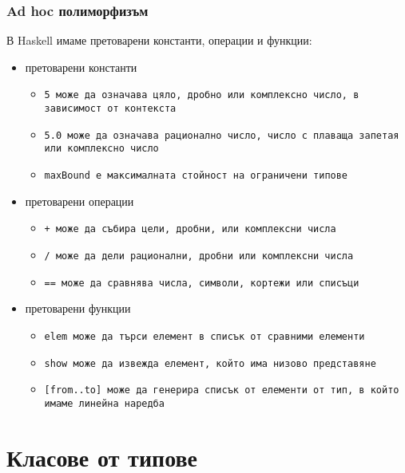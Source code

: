 \documentclass[alsotrans]{beamerswitch}
\begin{document}
\begin{frame}
  \frametitle{Ad hoc полиморфизъм}

  В Haskell имаме претоварени константи, операции и функции:
  \begin{itemize}[<+->]
  \item \alert{претоварени константи}
    \begin{itemize}
    \item \tt5 може да означава цяло, дробно или комплексно число, в зависимост от контекста
    \item \tt{5.0} може да означава рационално число, число с плаваща запетая или комплексно число
    \item \tt{maxBound} е максималната стойност на ограничени типове
    \end{itemize}
  \item \alert{претоварени операции}
    \begin{itemize}
    \item \tt+ може да събира цели, дробни, или комплексни числа
    \item \tt/ може да дели рационални, дробни или комплексни числа
    \item \tt{==} може да сравнява числа, символи, кортежи или списъци
    \end{itemize}
  \item \alert{претоварени функции}
    \begin{itemize}
    \item \tt{elem} може да търси елемент в списък от сравними елементи
    \item \tt{show} може да извежда елемент, който има низово представяне
    \item \tt{[from..to]} може да генерира списък от елементи от тип, в който имаме линейна наредба
    \end{itemize}
  \end{itemize}
\end{frame}

\section{Класове от типове}
\end{document}
